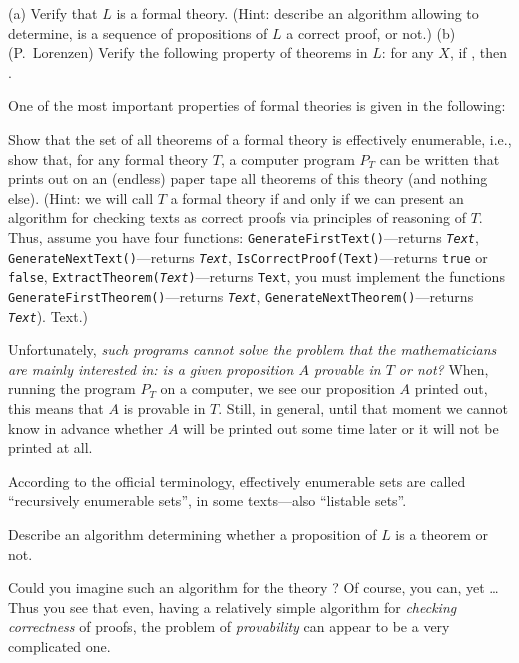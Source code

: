 \begin{exercise}
(a) Verify that \(L\) is a formal theory.
(Hint: describe an algorithm allowing to determine, is a sequence of propositions of \(L\) a correct proof, or not.)
(b) (P.~Lorenzen) Verify the following property of theorems in \(L\): for any \(X\), if , then .
\end{exercise}

One of the most important properties of formal theories is given in the following:

\begin{exercise}
Show that the set of all theorems of a formal theory is effectively enumerable, i.e., show that, for any formal theory \(T\), a computer program \(P_T\) can be written that prints out on an (endless) paper tape all theorems of this theory (and nothing else).
(Hint: we will call \(T\) a formal theory if and only if we can present an algorithm for checking texts as correct proofs via principles of reasoning of \(T\).
Thus, assume you have four functions: \texttt{GenerateFirstText()}---returns \texttt{\textit{Text}}, \texttt{GenerateNextText()}---returns \texttt{\textit{Text}}, \texttt{IsCorrectProof(Text)}---returns \texttt{true} or \texttt{false}, \texttt{ExtractTheorem(\textit{Text})}---returns \texttt{Text}, you must implement the functions \texttt{GenerateFirstTheorem()}---returns \texttt{\textit{Text}}, \texttt{GenerateNextTheorem()}---returns \texttt{\textit{Text}}).
Text.)

Unfortunately, \emph{such programs cannot solve the problem that the mathematicians are mainly interested in: is a given proposition \(A\) provable in \(T\) or not?}
When, running the program \(P_T\) on a computer, we see our proposition \(A\) printed out, this means that \(A\) is provable in \(T\).
Still, in general, until that moment we cannot know in advance whether \(A\) will be printed out some time later or it will not be printed at all.
\end{exercise}

\begin{note}
According to the official terminology, effectively enumerable sets are called ``recursively enumerable sets'', in some texts---also ``listable sets''.
\end{note}

\begin{exercise}\label{Lsolvable}
    \begin{inparaenum}[(a)]
        \item Describe an algorithm determining whether a proposition of \(L\) is a theorem or not.
        \item Could you imagine such an algorithm for the theory \CHESS?
        Of course, you can, yet \ldots
        Thus you see that even, having a relatively simple algorithm for \emph{checking correctness} of proofs, the problem of \emph{provability} can appear to be a very complicated one.
    \end{inparaenum}
\end{exercise}

